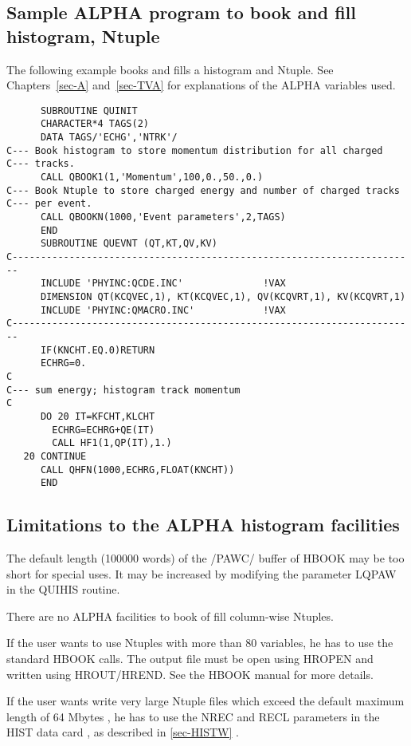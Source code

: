 \subsection{\label{sec-HIEXAM}Sample ALPHA program to book and fill
histogram, Ntuple}
\par
The following example books and fills a histogram and Ntuple. See
Chapters~\ref{sec-A} and~\ref{sec-TVA}
for explanations of the ALPHA variables used.
\begin{verbatim}
      SUBROUTINE QUINIT
      CHARACTER*4 TAGS(2)
      DATA TAGS/'ECHG','NTRK'/
C--- Book histogram to store momentum distribution for all charged
C--- tracks.
      CALL QBOOK1(1,'Momentum',100,0.,50.,0.)
C--- Book Ntuple to store charged energy and number of charged tracks
C--- per event.
      CALL QBOOKN(1000,'Event parameters',2,TAGS)
      END
      SUBROUTINE QUEVNT (QT,KT,QV,KV)
C-----------------------------------------------------------------------
      INCLUDE 'PHYINC:QCDE.INC'              !VAX
      DIMENSION QT(KCQVEC,1), KT(KCQVEC,1), QV(KCQVRT,1), KV(KCQVRT,1)
      INCLUDE 'PHYINC:QMACRO.INC'            !VAX
C-----------------------------------------------------------------------
      IF(KNCHT.EQ.0)RETURN
      ECHRG=0.
C
C--- sum energy; histogram track momentum
C
      DO 20 IT=KFCHT,KLCHT
        ECHRG=ECHRG+QE(IT)
        CALL HF1(1,QP(IT),1.)
   20 CONTINUE
      CALL QHFN(1000,ECHRG,FLOAT(KNCHT))
      END
\end{verbatim}
 
\subsection{\label{sec-HILIMI}Limitations to the ALPHA histogram facilities}
\par
The default length (100000 words) of the /PAWC/ buffer of HBOOK may be too short for
special uses. It may be increased by modifying  the parameter LQPAW in the QUIHIS routine.
\par
There are no ALPHA facilities to book of fill column-wise Ntuples.
\par
If the user wants to use Ntuples with more than 80 variables,
 he has to use the standard HBOOK calls. The output
file must be open using HROPEN and written using HROUT/HREND.  See the
HBOOK manual for more details.
\par
If the user wants
write very large Ntuple files which exceed the default maximum length
of 64 Mbytes , he has to use the NREC and RECL parameters in the HIST data card ,
as described in \ref{sec-HISTW} .
 
